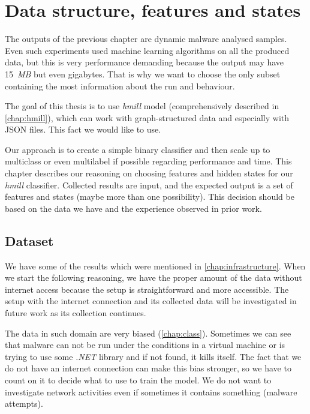 \chapter{Data structure, features and states} \label{chap:data}


The outputs of the previous chapter are dynamic malware analysed samples. Even such experiments used machine learning algorithms on all the produced data, but this is very performance demanding because the output may have 15~\emph{MB} but even gigabytes. That is why we want to choose the only subset containing the most information about the run and behaviour. 

The goal of this thesis is to use \emph{hmill} model (comprehensively described in \ref{chap:hmill}), which can work with graph-structured data and especially with JSON files. This fact we would like to use.

Our approach is to create a simple binary classifier and then scale up to multiclass or even multilabel if possible regarding performance and time. This chapter describes our reasoning on choosing features and hidden states for our \emph{hmill} classifier.  Collected results are input, and the expected output is a set of features and states (maybe more than one possibility). This decision should be based on the data we have and the experience observed in prior work.


\section{Dataset}
We have some of the results which were mentioned in \ref{chap:infrastructure}. When we start the following reasoning, we have the proper amount of the data without internet access because the setup is straightforward and more accessible. The setup with the internet connection and its collected data will be investigated in future work as its collection continues. 

The data in such domain are very biased (\ref{chap:class}). Sometimes we can see that malware can not be run under the conditions in a virtual machine or is trying to use some \emph{.NET} library and if not found, it kills itself. The fact that we do not have an internet connection can make this bias stronger, so we have to count on it to decide what to use to train the model. We do not want to investigate network activities even if sometimes it contains something (malware attempts).

